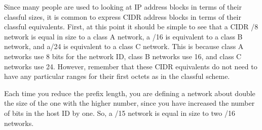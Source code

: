 Since many people are used to looking at IP address
blocks in terms of their classful sizes, it is common to express CIDR address
blocks in terms of their classful equivalents. First, at this point it
should be simple to see that a CIDR /8 network is equal in size to a
class A network, a /16 is equivalent to a class B network, and a/24 is
equivalent to a class C network. This is because class A networks use 8
bits for the network ID, class B networks use 16, and class C networks
use 24. However, remember that these CIDR equivalents do not need to
have any particular ranges for their first octets as in the classful
scheme.

Each time you reduce the prefix length, you are defining a network about
double the size of the one with the higher number, since you have
increased the number of bits in the host ID by one. So, a /15 network is
equal in size to two /16 networks.

%
%

